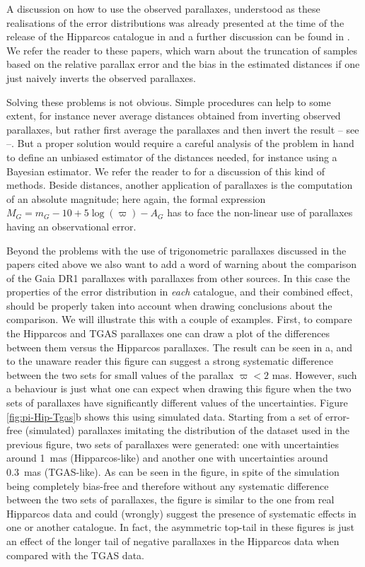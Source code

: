 A discussion on how to use the observed parallaxes, understood as
these realisations of the error distributions was already presented
at the time of the release of the Hipparcos catalogue in \citet{1997IAUJD..14E...5B}
and a further discussion can be found in \citet{1999ASPC..167...13A}. 
We refer the reader to these papers, which warn about
the truncation of samples based on the relative parallax error and 
the bias in the estimated distances if one just naively inverts the
observed parallaxes.

Solving these problems is not obvious. Simple procedures
can help to some extent, for instance never average distances
obtained from inverting observed parallaxes, but rather first average
the parallaxes and then invert the result -- see \citet{1999ASPC..167...13A} --.
But a proper solution would require a careful analysis of the 
problem in hand to define an unbiased estimator of the distances
needed, for instance using a Bayesian estimator. We refer the reader
to \citet{2015PASP..127..994B} for a discussion of this kind of
methods. Beside distances, another application of parallaxes is
the computation of an absolute magnitude; here again, the formal
expression $M_G = m_G - 10 + 5 \log(\varpi) - A_G$ has to face
the non-linear use of parallaxes having an observational error.

Beyond the problems with the use of trigonometric parallaxes discussed
in the papers cited above we also want to add a word of warning 
about the comparison of the Gaia DR1 parallaxes with parallaxes from
other sources. In this case the properties of the error distribution
in {\em each} catalogue, and their combined effect, should be properly taken
into account when drawing conclusions about the comparison. We will illustrate
this with a couple of examples. First, to compare the Hipparcos and
TGAS parallaxes one can draw a plot of the differences between them versus
the Hipparcos parallaxes. The result can be seen in a,
and to the unaware reader this figure can suggest a strong systematic difference
between the two sets for small values of the parallax $\varpi<2$ mas.
However, such a behaviour is just what one can expect when drawing this
figure when the two sets of parallaxes have significantly different values
of the uncertainties. Figure \ref{fig:pi-Hip-Tgas}b shows this using simulated data. 
Starting from a set of error-free (simulated) parallaxes imitating
the distribution of the dataset used in the previous figure, two sets of 
parallaxes were generated: one with uncertainties around 1~mas (Hipparcos-like) 
and another one with uncertainties around 0.3~mas (TGAS-like). As can be seen
in the figure, in spite of the simulation being completely bias-free
and therefore without any systematic difference between the two sets
of parallaxes, the figure is similar to the one from real Hipparcos data
and could (wrongly) suggest the presence of systematic effects in one
or another catalogue. In fact, the asymmetric top-tail in these figures
is just an effect of the longer tail of negative parallaxes in the 
Hipparcos data when compared with the TGAS data.

